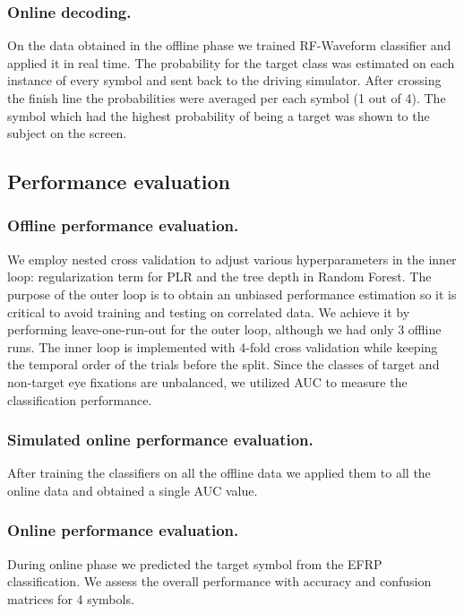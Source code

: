 \documentclass[12pt]{iopart}
\begin{document}
\subsubsection*{Online decoding.}
On the data obtained in the offline phase we trained RF-Waveform classifier
and applied it in real time. The probability for the target class was 
estimated on each instance of every symbol and sent
back to the driving simulator. After crossing the finish line
the probabilities were averaged per each symbol (1 out of 4).
The symbol which had the highest probability of being a target was
shown to the subject on the screen.


\subsection{Performance evaluation}

\subsubsection*{Offline performance evaluation.}
We employ nested cross validation to adjust various hyperparameters in the inner loop:
regularization term for PLR and the tree depth in Random Forest.
The purpose of the outer loop is to obtain an unbiased performance estimation
so it is critical to avoid training and testing on correlated data.
We achieve it by performing leave-one-run-out for the outer loop,
although we had only 3 offline runs.
The inner loop is implemented with 4-fold cross validation while keeping
the temporal order of the trials before the split.
Since the classes of target and non-target eye fixations are unbalanced,
we utilized AUC to measure the classification performance.

\subsubsection*{Simulated online performance evaluation.}
After training the classifiers on all the offline data we applied them 
to all the online data and obtained a single AUC value.

\subsubsection*{Online performance evaluation.}
During online phase we predicted the target symbol from the EFRP classification.
We assess the overall performance with accuracy and confusion matrices
for 4 symbols.
\end{document}
